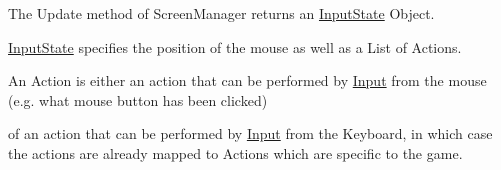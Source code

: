 The Update method of Screen\+Manager returns an \mbox{\hyperlink{classInputState}{Input\+State}} Object.

\mbox{\hyperlink{classInputState}{Input\+State}} specifies the position of the mouse as well as a List of Actions.

An Action is either an action that can be performed by \mbox{\hyperlink{classInput}{Input}} from the mouse (e.\+g. what mouse button has been clicked)

of an action that can be performed by \mbox{\hyperlink{classInput}{Input}} from the Keyboard, in which case the actions are already mapped to Actions which are specific to the game. 